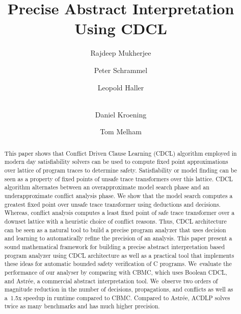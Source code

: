 \documentclass[a4paper]{llncs}
\begin{document}
\title{Precise Abstract Interpretation Using CDCL}

\author{Rajdeep Mukherjee \and Peter Schrammel \and 
Leopold Haller \and \\ 
Daniel Kroening \and Tom Melham}



\maketitle

\begin{abstract}
%
  This paper shows that Conflict Driven Clause Learning (CDCL) algorithm
  employed in modern day satisfiability solvers can be used to compute 
  fixed point approximations over lattice of program traces to determine 
  safety.  Satisfiability or model finding can be seen as a property of fixed 
  points of unsafe trace transformers over this lattice.  CDCL algorithm 
  alternates between an overapproximate model search phase and an 
  underapproximate conflict analysis phase.  We show that 
  the model search computes a greatest fixed point over unsafe trace transformer
  using deductions and decisions.  Whereas, conflict analysis computes a 
  least fixed point of safe trace transformer over a downset lattice with 
  a heuristic choice of conflict reasons.  Thus, CDCL architecture can be seen 
  as a natural tool to build a precise program analyzer that uses decision and 
  learning to automatically refine the precision of an analysis. This paper
  present a sound mathematical framework for building a precise abstract 
  interpretation based program analyzer using CDCL architecture as well as a practical tool 
  that implements these ideas for automatic bounded safety verification of C programs. 
  We~evaluate the performance of our analyser by comparing with CBMC, which
  uses Boolean CDCL, and Astr{\'e}e, a commercial abstract interpretation tool. 
  We~observe two orders of magnitude reduction in the number of decisions,
  propagations, and conflicts as well as a~1.5x speedup in runtime compared to
  CBMC.  Compared to Astr{\'e}e, ACDLP solves twice as many benchmarks and has
  much higher precision.  
%
\end{abstract}
\end{document}
